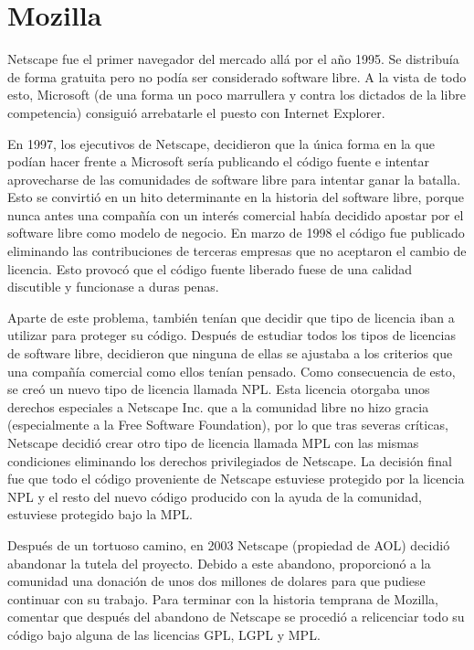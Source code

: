 \newpage
\section{Mozilla}
Netscape fue el primer navegador del mercado all\'a por el año 1995. Se distribu\'ia de forma gratuita pero no pod\'ia ser considerado software libre. A la vista de todo esto, Microsoft (de una forma un poco marrullera y contra los dictados de la libre competencia) consigui\'o arrebatarle el puesto con Internet Explorer.

En 1997, los ejecutivos de Netscape, decidieron que la \'unica forma en la que pod\'ian hacer frente a Microsoft ser\'ia publicando el c\'odigo fuente e intentar aprovecharse de las comunidades de software libre para intentar ganar la batalla. Esto se convirti\'o en un hito determinante en la historia del software libre, porque nunca antes una compañ\'ia con un inter\'es comercial hab\'ia decidido apostar por el software libre como modelo de negocio. En marzo de 1998 el c\'odigo fue publicado eliminando las contribuciones de terceras empresas que no aceptaron el cambio de licencia. Esto provoc\'o que el c\'odigo fuente liberado fuese de una calidad discutible y funcionase a duras penas.

Aparte de este problema, tambi\'en ten\'ian que decidir que tipo de licencia iban a utilizar para proteger su c\'odigo. Despu\'es de estudiar todos los tipos de licencias de software libre, decidieron que ninguna de ellas se ajustaba a los criterios que una compañ\'ia comercial como ellos ten\'ian pensado. Como consecuencia de esto, se cre\'o un nuevo tipo de licencia llamada NPL. Esta licencia otorgaba unos derechos especiales a Netscape Inc. que a la comunidad libre no hizo gracia (especialmente a la Free Software Foundation), por lo que tras severas cr\'iticas, Netscape decidi\'o crear otro tipo de licencia llamada MPL con las mismas condiciones eliminando los derechos privilegiados de Netscape. La decisi\'on final fue que todo el c\'odigo proveniente de Netscape estuviese protegido por la licencia NPL y el resto del nuevo c\'odigo producido con la ayuda de la comunidad, estuviese protegido bajo la MPL.

Despu\'es de un tortuoso camino, en 2003 Netscape (propiedad de AOL) decidi\'o abandonar la tutela del proyecto. Debido a este abandono, proporcion\'o a la comunidad una donaci\'on de unos dos millones de dolares para que pudiese continuar con su trabajo. Para terminar con la historia temprana de Mozilla, comentar que despu\'es del abandono de Netscape se procedi\'o a relicenciar todo su c\'odigo bajo alguna de las licencias GPL, LGPL y MPL.

